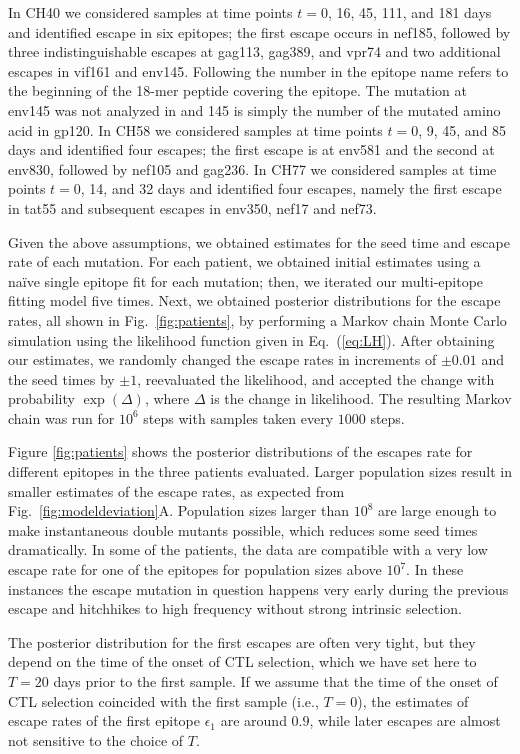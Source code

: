 \documentclass{frontiers}
\newcommand{\EQ}[1]{Eq.~(\ref{eq:#1})}
\newcommand{\FIG}[1]{Fig.~\ref{fig:#1}}
\newcommand{\fcoeff}{\epsilon}
\begin{document}
In CH40 we considered samples at time points $t = 0$, 16, 45, 111, and 181 days and 
identified escape in six epitopes; the first escape occurs in nef185, followed by three indistinguishable escapes at
gag113, gag389, and vpr74
and two additional escapes in vif161 and env145. Following 
\citet{ganusov_fitness_2011} the number in the epitope name refers
to the beginning of the 18-mer peptide covering the epitope. The mutation
at env145 was not analyzed in \citet{ganusov_fitness_2011} and 145
is simply the number of the mutated amino acid in gp120.
In CH58 we considered samples at time points $t = 0$, 9, 45, and 85 days and identified
four escapes; the first escape is at env581 and the second at env830,
followed by nef105 and gag236. 
In CH77 we considered samples at time points 
$t = 0$, 14, and 32 days and identified four escapes, namely the first escape
in tat55 and subsequent escapes in env350, nef17 and nef73.

Given the above assumptions, we obtained estimates for the seed time and escape rate 
of each mutation. For each patient, we obtained initial estimates using a 
na\"ive single epitope fit for each mutation; then, we iterated
our multi-epitope fitting model five times. Next, we obtained posterior
distributions for the escape rates, all shown in \FIG{patients}, by performing a Markov chain Monte
Carlo simulation using the likelihood function given in \EQ{LH}. After obtaining our 
estimates, we randomly changed the escape rates in
increments of $\pm 0.01$ and the seed times by $\pm 1$, reevaluated the
likelihood, and accepted the change with probability $\exp(\Delta)$, where
$\Delta$ is the change in likelihood. The resulting Markov chain was run for
$10^6$ steps with samples taken every $1000$ steps.


Figure \ref{fig:patients} shows the posterior distributions of the escapes rate for
different epitopes in the three patients evaluated. Larger
population sizes result in smaller estimates of the escape rates, as expected 
from \FIG{modeldeviation}A.
Population sizes larger than $10^8$ are large enough to make
instantaneous double mutants possible, which reduces some seed times
dramatically. In some of the patients, the data are compatible with a very low
escape rate for one of the epitopes for population sizes above $10^7$. In these
instances the escape mutation in question happens very early during the previous
escape and hitchhikes to high frequency without strong intrinsic selection. 

The posterior distribution for the first escapes are often very tight,
but they depend on the time of the onset of CTL selection, which we have
set here to $T=20$ days prior to the first sample. If we assume that the
time of the onset of CTL selection coincided with the first sample (i.e., $T=0$), the
estimates of escape rates of the first epitope $\fcoeff_1$ are around
$0.9$, while later escapes are almost not sensitive to the choice of $T$.
\end{document}
